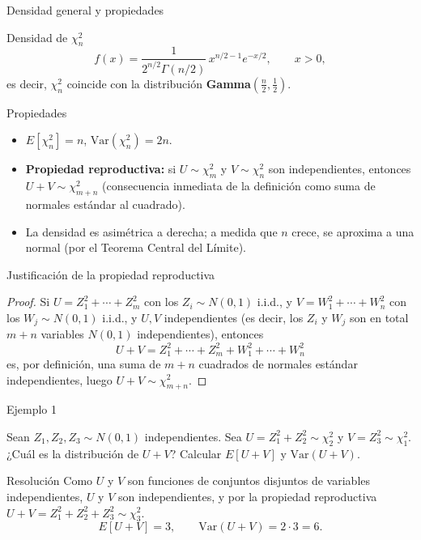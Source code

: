 \documentclass[aspectratio=169,11pt]{beamer}
\begin{document}
\begin{frame}{Densidad general y propiedades}
\begin{block}{Densidad de $\chi^2_n$}
\[
f(x) = \frac{1}{2^{n/2}\Gamma(n/2)}\, x^{n/2-1} e^{-x/2}, \qquad x>0,
\]
es decir, $\chi^2_n$ coincide con la distribución \textbf{Gamma}$\left(\tfrac{n}{2}, \tfrac12\right)$.
\end{block}
\begin{block}{Propiedades}
\begin{itemize}
\item $E[\chi^2_n] = n$, \quad $\text{Var}(\chi^2_n) = 2n$.
\item \textbf{Propiedad reproductiva:} si $U\sim\chi^2_m$ y $V\sim\chi^2_n$ son independientes, entonces $U+V\sim\chi^2_{m+n}$ (consecuencia inmediata de la definición como suma de normales estándar al cuadrado).
\item La densidad es asimétrica a derecha; a medida que $n$ crece, se aproxima a una normal (por el Teorema Central del Límite).
\end{itemize}
\end{block}
\end{frame}

\begin{frame}{Justificación de la propiedad reproductiva}
\begin{proof}
Si $U = Z_1^2+\cdots+Z_m^2$ con los $Z_i\sim N(0,1)$ i.i.d., y $V=W_1^2+\cdots+W_n^2$ con los $W_j\sim N(0,1)$ i.i.d., y $U,V$ independientes (es decir, los $Z_i$ y $W_j$ son en total $m+n$ variables $N(0,1)$ independientes), entonces
\[
U+V = Z_1^2+\cdots+Z_m^2+W_1^2+\cdots+W_n^2
\]
es, por definición, una suma de $m+n$ cuadrados de normales estándar independientes, luego $U+V\sim\chi^2_{m+n}$. \qedhere
\end{proof}
\end{frame}

\begin{frame}{Ejemplo 1}
\begin{example}
Sean $Z_1,Z_2,Z_3\sim N(0,1)$ independientes. Sea $U=Z_1^2+Z_2^2 \sim \chi_2^2$ y $V = Z_3^2 \sim \chi_1^2$. ¿Cuál es la distribución de $U+V$? Calcular $E[U+V]$ y $\text{Var}(U+V)$.
\end{example}
\pause
\begin{block}{Resolución}
Como $U$ y $V$ son funciones de conjuntos disjuntos de variables independientes, $U$ y $V$ son independientes, y por la propiedad reproductiva $U+V = Z_1^2+Z_2^2+Z_3^2 \sim \chi_3^2$.
\[
E[U+V] = 3, \qquad \text{Var}(U+V) = 2\cdot 3 = 6.
\]
\end{block}
\end{frame}
\end{document}
